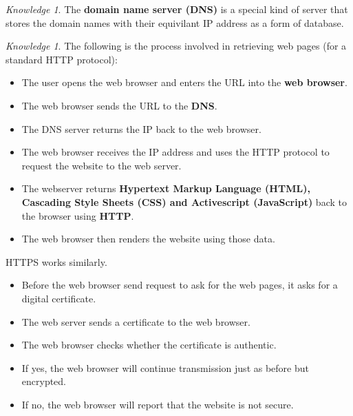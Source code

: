 \documentclass[8pt]{article}
\theoremstyle{remark}
\newtheorem{knowledge}[method]{Knowledge}
\begin{document}
            \begin{knowledge}
                The \textbf{domain name server (DNS)} is a special kind of server that stores the domain names with their equivilant IP address as a form of database.
            \end{knowledge}

            \begin{knowledge}
                The following is the process involved in retrieving web pages (for a standard HTTP protocol):
                \begin{itemize}
                    \item The user opens the web browser and enters the URL into the \textbf{web browser}.
                    \item The web browser sends the URL to the \textbf{DNS}.
                    \item The DNS server returns the IP back to the web browser.
                    \item The web browser receives the IP address and uses the HTTP protocol to request the website to the web server.
                    \item The webserver returns \textbf{Hypertext Markup Language (HTML), Cascading Style Sheets (CSS) and Activescript (JavaScript)} back to the browser using \textbf{HTTP}.
                    \item The web browser then renders the website using those data.
                \end{itemize}

                HTTPS works similarly.
                \begin{itemize}
                    \item Before the web browser send request to ask for the web pages, it asks for a digital certificate.
                    \item The web server sends a certificate to the web browser.
                    \item The web browser checks whether the certificate is authentic.
                    \item If yes, the web browser will continue transmission just as before but encrypted.
                    \item If no, the web browser will report that the website is not secure.
                \end{itemize}
            \end{knowledge}
\end{document}
